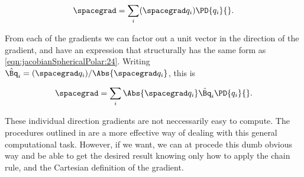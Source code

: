 \begin{align}\label{eqn:jacobianSphericalPolar:30}
\spacegrad = \sum_i (\spacegrad q_i) \PD{q_i}{}.
\end{align}

From each of the gradients we can factor out a unit vector in the direction of the gradient, and have an expression that structurally has the same form as \ref{eqn:jacobianSphericalPolar:24}.  Writing $\hat{\Bq}_i = (\spacegrad q_i)/\Abs{\spacegrad q_i}$, this is

\begin{align}\label{eqn:jacobianSphericalPolar:31}
\spacegrad = \sum_i \Abs{\spacegrad q_i} \hat{\Bq}_i \PD{q_i}{}.
\end{align}

These individual direction gradients are not neccessarily easy to compute.  The procedures outlined in \cite{byron1992mca} are a more effective way of dealing with this general computational task.  However, if we want, we can at procede this dumb obvious way and be able to get the desired result knowing only how to apply the chain rule, and the Cartesian definition of the gradient.

\EndArticle
